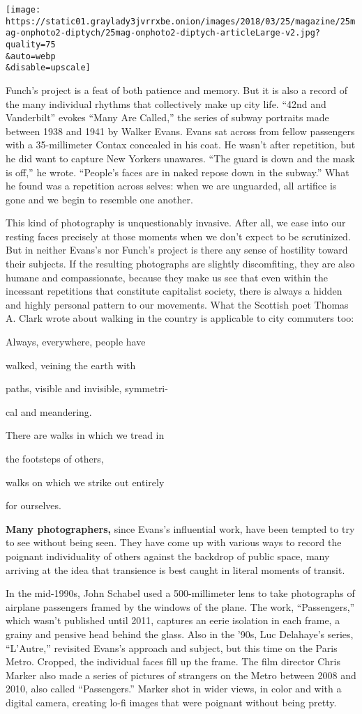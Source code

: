 \texttt{[image: https://static01.graylady3jvrrxbe.onion/images/2018/03/25/magazine/25mag-onphoto2-diptych/25mag-onphoto2-diptych-articleLarge-v2.jpg?quality=75\\\&auto=webp\\\&disable=upscale]}

Funch's project is a feat of both patience and memory. But it is also a
record of the many individual rhythms that collectively make up city
life. ``42nd and Vanderbilt'' evokes ``Many Are Called,'' the series of
subway portraits made between 1938 and 1941 by Walker Evans. Evans sat
across from fellow passengers with a 35-millimeter Contax concealed in
his coat. He wasn't after repetition, but he did want to capture New
Yorkers unawares. ``The guard is down and the mask is off,'' he wrote.
``People's faces are in naked repose down in the subway.'' What he found
was a repetition across selves: when we are unguarded, all artifice is
gone and we begin to resemble one another.

This kind of photography is unquestionably invasive. After all, we ease
into our resting faces precisely at those moments when we don't expect
to be scrutinized. But in neither Evans's nor Funch's project is there
any sense of hostility toward their subjects. If the resulting
photographs are slightly discomfiting, they are also humane and
compassionate, because they make us see that even within the incessant
repetitions that constitute capitalist society, there is always a hidden
and highly personal pattern to our movements. What the Scottish poet
Thomas A. Clark wrote about walking in the country is applicable to city
commuters too:

Always, everywhere, people have

walked, veining the earth with

paths, visible and invisible, symmetri-

cal and meandering.

There are walks in which we tread in

the footsteps of others,

walks on which we strike out entirely

for ourselves.

\textbf{Many photographers,} since Evans's influential work, have been
tempted to try to see without being seen. They have come up with various
ways to record the poignant individuality of others against the backdrop
of public space, many arriving at the idea that transience is best
caught in literal moments of transit.

In the mid-1990s, John Schabel used a 500-millimeter lens to take
photographs of airplane passengers framed by the windows of the plane.
The work, ``Passengers,'' which wasn't published until 2011, captures an
eerie isolation in each frame, a grainy and pensive head behind the
glass. Also in the '90s, Luc Delahaye's series, ``L'Autre,'' revisited
Evans's approach and subject, but this time on the Paris Metro. Cropped,
the individual faces fill up the frame. The film director Chris Marker
also made a series of pictures of strangers on the Metro between 2008
and 2010, also called ``Passengers.'' Marker shot in wider views, in
color and with a digital camera, creating lo-fi images that were
poignant without being pretty.

